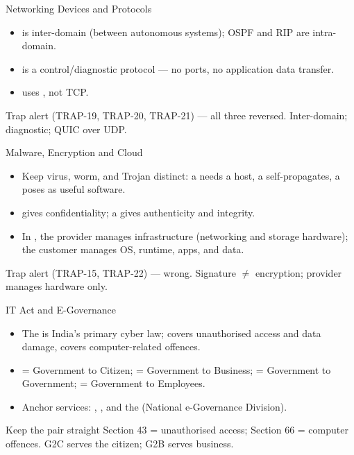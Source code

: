 \documentclass[aspectratio=169]{beamer}
\begin{document}
\begin{frame}{Networking Devices and Protocols}
  \begin{itemize}
    \item {} is inter-domain (between autonomous systems); OSPF and RIP
      are intra-domain.
    \item {} is a control/diagnostic protocol --- no ports, no
      application data transfer.
    \item {} uses , not TCP.
  \end{itemize}
  \begin{alertblock}{Trap alert (TRAP-19, TRAP-20, TRAP-21)}
     --- all
    three reversed. Inter-domain; diagnostic; QUIC over UDP.
  \end{alertblock}
\end{frame}

\begin{frame}{Malware, Encryption and Cloud}
  \begin{itemize}
    \item Keep virus, worm, and Trojan distinct: a  needs a host,
      a  self-propagates, a  poses as useful software.
    \item {} gives confidentiality; a 
      gives authenticity and integrity.
    \item In , the provider manages infrastructure (networking and
      storage hardware); the customer manages OS, runtime, apps, and data.
  \end{itemize}
  \begin{alertblock}{Trap alert (TRAP-15, TRAP-22)}
     ---
    wrong. Signature $\ne$ encryption; provider manages hardware only.
  \end{alertblock}
\end{frame}

\begin{frame}{IT Act and E-Governance}
  \begin{itemize}
    \item The  is India's primary
      cyber law;  covers unauthorised access and data damage,
       covers computer-related offences.
    \item {} = Government to Citizen;  = Government to
      Business;  = Government to Government;  = Government
      to Employees.
    \item Anchor services: , , and the
       (National e-Governance Division).
  \end{itemize}
  \begin{block}{Keep the pair straight}
    Section 43 = unauthorised access; Section 66 = computer offences. G2C
    serves the citizen; G2B serves business.
  \end{block}
\end{frame}
\end{document}
